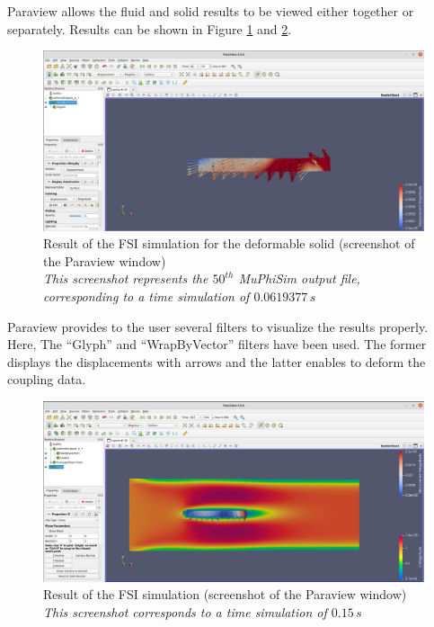 \documentclass[oneside,11pt,times]{book}
\begin{document}
Paraview allows the fluid and solid results to be viewed either together or separately. Results can be shown in Figure \ref{result1} and \ref{result2}.
\begin{figure}[H]
    \centering
    \includegraphics[width=15cm]{imgs/Illustrations/result flap.png}
    \caption{Result of the FSI simulation for the deformable solid (screenshot of the Paraview window)\\ \emph{This screenshot represents the $50^{th}$ MuPhiSim output file, corresponding to a time simulation of $0.0619377\,s$}}
    \label{result1}
\end{figure}
Paraview provides to the user several filters to visualize the results properly. Here, The ``Glyph'' and ``WrapByVector'' filters have been used. The former displays the displacements with arrows and the latter enables to deform the coupling data.\\
\begin{figure}[h]
    \centering
    \includegraphics[width=15cm]{imgs/Illustrations/result both.png}
    \caption{Result of the FSI simulation (screenshot of the Paraview window)\\ \emph{This screenshot corresponds to a time simulation of $0.15\,s$ }}
    \label{result2}
\end{figure}
\end{document}

